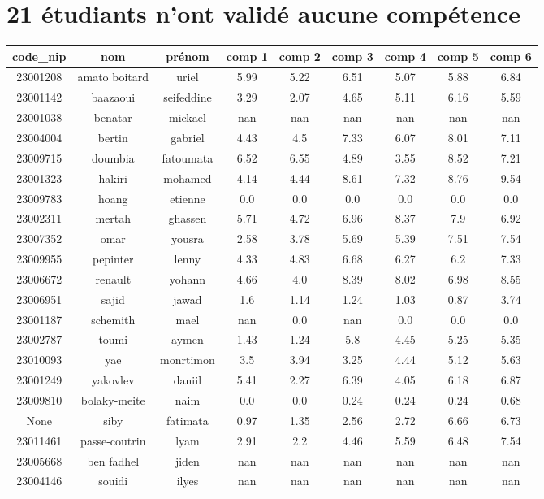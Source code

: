 \documentclass{article}%
\begin{document}
\section{21 étudiants n'ont validé aucune compétence}%
\label{sec:21tudiantsnontvalidaucunecomptence}%
\begin{tabular}{|c|c|c|c|c|c|c|c|c|}%
\hline%
code\_nip&nom&prénom&comp 1&comp 2&comp 3&comp 4&comp 5&comp 6\\%
\hline%
23001208&amato boitard&uriel&5.99&5.22&6.51&5.07&5.88&6.84\\%
\hline%
23001142&baazaoui&seifeddine&3.29&2.07&4.65&5.11&6.16&5.59\\%
\hline%
23001038&benatar&mickael&nan&nan&nan&nan&nan&nan\\%
\hline%
23004004&bertin&gabriel&4.43&4.5&7.33&6.07&8.01&7.11\\%
\hline%
23009715&doumbia&fatoumata&6.52&6.55&4.89&3.55&8.52&7.21\\%
\hline%
23001323&hakiri&mohamed&4.14&4.44&8.61&7.32&8.76&9.54\\%
\hline%
23009783&hoang&etienne&0.0&0.0&0.0&0.0&0.0&0.0\\%
\hline%
23002311&mertah&ghassen&5.71&4.72&6.96&8.37&7.9&6.92\\%
\hline%
23007352&omar&yousra&2.58&3.78&5.69&5.39&7.51&7.54\\%
\hline%
23009955&pepinter&lenny&4.33&4.83&6.68&6.27&6.2&7.33\\%
\hline%
23006672&renault&yohann&4.66&4.0&8.39&8.02&6.98&8.55\\%
\hline%
23006951&sajid&jawad&1.6&1.14&1.24&1.03&0.87&3.74\\%
\hline%
23001187&schemith&mael&nan&0.0&nan&0.0&0.0&0.0\\%
\hline%
23002787&toumi&aymen&1.43&1.24&5.8&4.45&5.25&5.35\\%
\hline%
23010093&yae&monrtimon&3.5&3.94&3.25&4.44&5.12&5.63\\%
\hline%
23001249&yakovlev&daniil&5.41&2.27&6.39&4.05&6.18&6.87\\%
\hline%
23009810&bolaky{-}meite&naim&0.0&0.0&0.24&0.24&0.24&0.68\\%
\hline%
None&siby&fatimata&0.97&1.35&2.56&2.72&6.66&6.73\\%
\hline%
23011461&passe{-}coutrin&lyam&2.91&2.2&4.46&5.59&6.48&7.54\\%
\hline%
23005668&ben fadhel&jiden&nan&nan&nan&nan&nan&nan\\%
\hline%
23004146&souidi&ilyes&nan&nan&nan&nan&nan&nan\\%
\hline%
\end{tabular}

%
\end{document}
